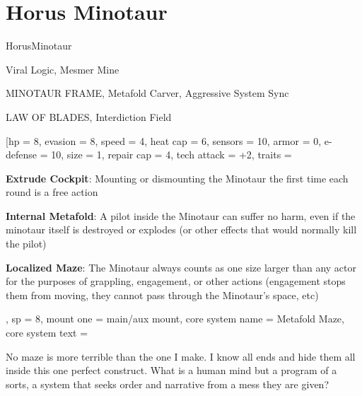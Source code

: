 \section{Horus Minotaur}

\begin{mech}{Horus}{Minotaur}


\begin{license}
\item Viral Logic, Mesmer Mine
\item MINOTAUR FRAME, Metafold Carver, Aggressive System Sync
\item LAW OF BLADES, Interdiction Field
\end{license}


\frameBox
[hp = 8,
evasion = 8,
speed = 4,
heat cap = 6,
sensors = 10,
armor = 0,
e-defense = 10,
size = 1,
repair cap = 4,
tech attack = +2,
traits = {
      \textbf{Extrude Cockpit}: Mounting or dismounting the Minotaur the first time each round is a free action

      \textbf{Internal Metafold}: A pilot inside the Minotaur can suffer no harm, even if the minotaur itself is destroyed or explodes (or other effects that would normally kill the pilot)
      
      \textbf{Localized Maze}: The Minotaur always counts as one size larger than any actor for the purposes of grappling, engagement, or other actions (engagement stops them from moving, they cannot pass through the Minotaur’s space, etc)
      },
sp = 8,
mount one = main/aux mount,
core system name = Metafold Maze,
core system text = {No maze is more terrible than the one I make. I know all ends and hide them all inside this one perfect construct. What is a human mind but a program of a sorts, a system that seeks order and narrative from a mess they are given?

}
\end{mech}

